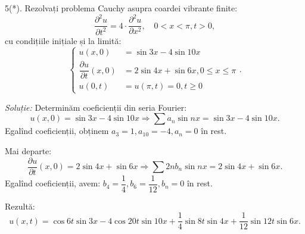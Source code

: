 \vspace{1cm}

5(*). Rezolvați problema Cauchy asupra coardei vibrante finite:
\[
  \dfrac{\partial^2 u}{\partial t^2} = 4 \cdot \dfrac{\partial^2 u}{\partial x^2}, %
  \quad 0 < x < \pi, t > 0,
\]
cu condițiile inițiale și la limită:
\[
  \begin{cases}
    u(x, 0) &= \sin 3x - 4 \sin 10x \\
    \dfrac{\partial u}{\partial t}(x, 0) &= 2 \sin 4x + \sin 6x, 0 \leq x \leq \pi \\
    u(0, t) &= u(\pi, t) = 0, t \geq 0
  \end{cases}.
\]

\vspace{1cm}

\emph{Soluție:} Determinăm coeficienții din seria Fourier:
\[
  u(x, 0) = \sin 3x - 4\sin 10x \Rightarrow \sum a_n \sin nx = \sin 3x - 4 \sin 10x.
\]
Egalînd coeficienții, obținem $ a_3 = 1, a_{10} = -4, a_n = 0 $ în rest.

Mai departe:
\[
  \dfrac{\partial u}{\partial t}(x, 0) = 2\sin 4x + \sin 6x \Rightarrow %
  \sum 2nb_n \sin nx = 2\sin 4x + \sin 6x.
\]
Egalînd coeficienții, avem: $ b_4 = \dfrac{1}{4}, b_6 = \dfrac{1}{12}, b_n = 0 $ în rest.

Rezultă:
\[
  u(x, t) = \cos 6t \sin 3x - 4\cos 20t \sin 10x + \dfrac{1}{4} \sin 8t \sin 4x + %
  \dfrac{1}{12} \sin 12t \sin 6x.
\]

\vspace{1cm}

